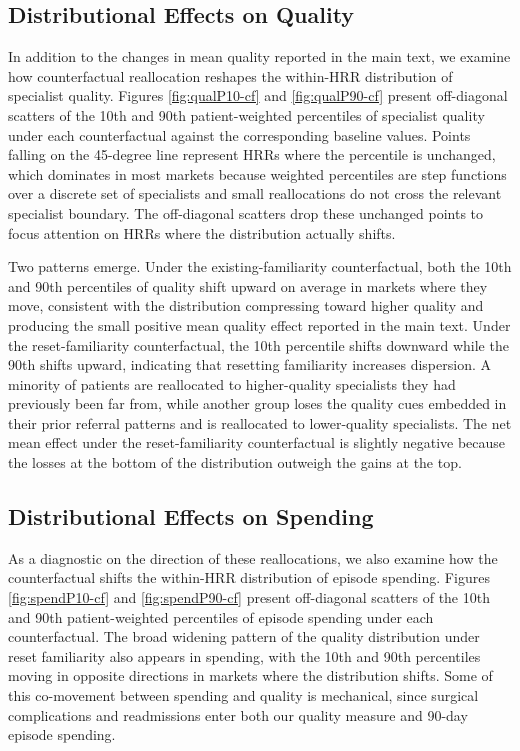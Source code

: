 \documentclass[12pt]{article}
\begin{document}
\subsection{Distributional Effects on Quality}
\label{app:distributional}

In addition to the changes in mean quality reported in the main text, we examine how counterfactual reallocation reshapes the within-HRR distribution of specialist quality. Figures \ref{fig:qualP10-cf} and \ref{fig:qualP90-cf} present off-diagonal scatters of the 10th and 90th patient-weighted percentiles of specialist quality under each counterfactual against the corresponding baseline values. Points falling on the 45-degree line represent HRRs where the percentile is unchanged, which dominates in most markets because weighted percentiles are step functions over a discrete set of specialists and small reallocations do not cross the relevant specialist boundary. The off-diagonal scatters drop these unchanged points to focus attention on HRRs where the distribution actually shifts.

Two patterns emerge. Under the existing-familiarity counterfactual, both the 10th and 90th percentiles of quality shift upward on average in markets where they move, consistent with the distribution compressing toward higher quality and producing the small positive mean quality effect reported in the main text. Under the reset-familiarity counterfactual, the 10th percentile shifts downward while the 90th shifts upward, indicating that resetting familiarity increases dispersion. A minority of patients are reallocated to higher-quality specialists they had previously been far from, while another group loses the quality cues embedded in their prior referral patterns and is reallocated to lower-quality specialists. The net mean effect under the reset-familiarity counterfactual is slightly negative because the losses at the bottom of the distribution outweigh the gains at the top.

\subsection{Distributional Effects on Spending}
\label{app:distributional-spending}

As a diagnostic on the direction of these reallocations, we also examine how the counterfactual shifts the within-HRR distribution of episode spending. Figures \ref{fig:spendP10-cf} and \ref{fig:spendP90-cf} present off-diagonal scatters of the 10th and 90th patient-weighted percentiles of episode spending under each counterfactual. The broad widening pattern of the quality distribution under reset familiarity also appears in spending, with the 10th and 90th percentiles moving in opposite directions in markets where the distribution shifts. Some of this co-movement between spending and quality is mechanical, since surgical complications and readmissions enter both our quality measure and 90-day episode spending.
\end{document}
